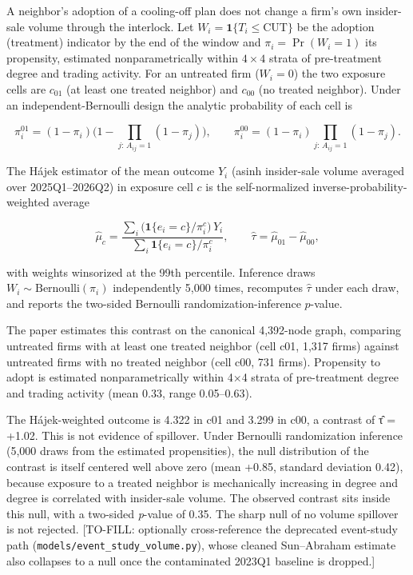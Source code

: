 \documentclass[
  a4paper,
]{article}
\begin{document}
A neighbor's adoption of a cooling-off plan does not change a firm's own
insider-sale volume through the interlock. Let
\(W_i = \mathbf{1}\{T_i \le \text{CUT}\}\) be the adoption (treatment)
indicator by the end of the window and \(\pi_i = \Pr(W_i = 1)\) its
propensity, estimated nonparametrically within \(4\times 4\) strata of
pre-treatment degree and trading activity. For an untreated firm
(\(W_i = 0\)) the two exposure cells are \(c_{01}\) (at least one
treated neighbor) and \(c_{00}\) (no treated neighbor). Under an
independent-Bernoulli design the analytic probability of each cell is

\[ \pi_i^{01} = (1 - \pi_i)\Big(1 - \!\!\prod_{j:\,A_{ij}=1}\!\!(1 - \pi_j)\Big), \qquad \pi_i^{00} = (1 - \pi_i)\!\!\prod_{j:\,A_{ij}=1}\!\!(1 - \pi_j). \]

The Hájek estimator of the mean outcome \(Y_i\) (asinh insider-sale
volume averaged over 2025Q1--2026Q2) in exposure cell \(c\) is the
self-normalized inverse-probability-weighted average

\[ \hat\mu_c = \frac{\sum_i \big(\mathbf{1}\{e_i = c\}/\pi_i^{c}\big)\, Y_i}{\sum_i \mathbf{1}\{e_i = c\}/\pi_i^{c}}, \qquad \hat\tau = \hat\mu_{01} - \hat\mu_{00}, \]

with weights winsorized at the 99th percentile. Inference draws
\(W_i \sim \text{Bernoulli}(\pi_i)\) independently 5,000 times,
recomputes \(\hat\tau\) under each draw, and reports the two-sided
Bernoulli randomization-inference \(p\)-value.

The paper estimates this contrast on the canonical 4,392-node graph,
comparing untreated firms with at least one treated neighbor (cell c01,
1,317 firms) against untreated firms with no treated neighbor (cell c00,
731 firms). Propensity to adopt is estimated nonparametrically within
4×4 strata of pre-treatment degree and trading activity (mean 0.33,
range 0.05--0.63).

The Hájek-weighted outcome is 4.322 in c01 and 3.299 in c00, a contrast
of τ̂ = +1.02. This is not evidence of spillover. Under Bernoulli
randomization inference (5,000 draws from the estimated propensities),
the null distribution of the contrast is itself centered well above zero
(mean +0.85, standard deviation 0.42), because exposure to a treated
neighbor is mechanically increasing in degree and degree is correlated
with insider-sale volume. The observed contrast sits inside this null,
with a two-sided \emph{p}-value of 0.35. The sharp null of no volume
spillover is not rejected. {[}TO-FILL: optionally cross-reference the
deprecated event-study path (\texttt{models/event\_study\_volume.py}),
whose cleaned Sun--Abraham estimate also collapses to a null once the
contaminated 2023Q1 baseline is dropped.{]}
\end{document}
